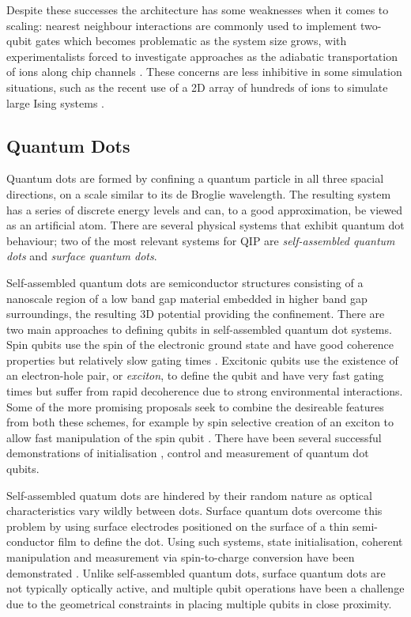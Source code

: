 Despite these successes the architecture has some weaknesses when it comes to scaling: nearest neighbour interactions are commonly used to implement two-qubit gates which becomes problematic as the system size grows, with experimentalists forced to investigate approaches as the adiabatic transportation of ions along chip channels \cite{ion_trap_on_chip}. These concerns are less inhibitive in some simulation situations, such as the recent use of a 2D array of hundreds of ions to simulate large Ising systems \cite{ion_trap_magnetism_simulator}.

\subsection{Quantum Dots}

Quantum dots are formed by confining a quantum particle in all three spacial directions, on a scale similar to its de Broglie wavelength. The resulting system has a series of discrete energy levels and can, to a good approximation, be viewed as an artificial atom. There are several physical systems that exhibit quantum dot behaviour; two of the most relevant systems for QIP are \textit{self-assembled quantum dots} and \textit{surface quantum dots}.

Self-assembled quantum dots are semiconductor structures consisting of a nanoscale region of a low band gap material embedded in higher band gap surroundings, the resulting 3D potential providing the confinement.  There are two main approaches to defining qubits in self-assembled quantum dot systems. Spin qubits use the spin of the electronic ground state and have good coherence properties \cite{Kroutvar:2004p4951, Greilich:2006p5031} but relatively slow gating times \cite{Burkard:1999p5057}. Excitonic qubits use the existence of an electron-hole pair, or \textit{exciton}, to define the qubit and have very fast gating times \cite{Li:2003p5178} but suffer from rapid decoherence due to strong environmental interactions. Some of the more promising proposals seek to combine the desireable features from both these schemes, for example by spin selective creation of an exciton to allow fast manipulation of the spin qubit \cite{Calarco:2003p5363, Chen:2000p5290, Yokoi:2005p5390, pazy_damico}. There have been several successful demonstrations of initialisation \cite{atature_quantum_dot_06, gerardot_dot_08}, control \cite{quantum_dot_control_08} and measurement \cite{quantum_dot_measurement_06} of quantum dot qubits.

Self-assembled quatum dots are hindered by their random nature as optical characteristics vary wildly between dots. Surface quantum dots overcome this problem by using surface electrodes positioned on the surface of a thin semi-conductor film to define the dot. Using such systems, state initialisation, coherent manipulation and measurement via spin-to-charge conversion have been demonstrated \cite{quantum_dot_nanowires_example}. Unlike self-assembled quantum dots, surface quantum dots are not typically optically active, and multiple qubit operations have been a challenge due to the geometrical constraints in placing multiple qubits in close proximity.

